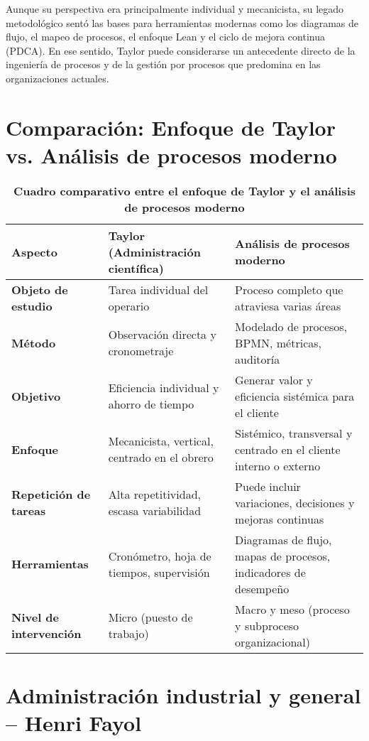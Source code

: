 \documentclass[a4paper,12pt]{article}
\begin{document}
	Aunque su perspectiva era principalmente individual y mecanicista, su legado metodológico sentó las bases para herramientas modernas como los diagramas de flujo, el mapeo de procesos, el enfoque Lean y el ciclo de mejora continua (PDCA). En ese sentido, Taylor puede considerarse un antecedente directo de la ingeniería de procesos y de la gestión por procesos que predomina en las organizaciones actuales.
	
	
	\section*{Comparación: Enfoque de Taylor vs. Análisis de procesos moderno}
	
	\begin{table}[h!]
		\centering
		\caption*{\textbf{Cuadro comparativo entre el enfoque de Taylor y el análisis de procesos moderno}}
		\begin{tabularx}{\textwidth}{>{\bfseries}l X X}
			\toprule
			\textbf{Aspecto} & \textbf{Taylor (Administración científica)} & \textbf{Análisis de procesos moderno} \\
			\midrule
			Objeto de estudio & Tarea individual del operario & Proceso completo que atraviesa varias áreas \\
			\addlinespace
			Método & Observación directa y cronometraje & Modelado de procesos, BPMN, métricas, auditoría \\
			\addlinespace
			Objetivo & Eficiencia individual y ahorro de tiempo & Generar valor y eficiencia sistémica para el cliente \\
			\addlinespace
			Enfoque & Mecanicista, vertical, centrado en el obrero & Sistémico, transversal y centrado en el cliente interno o externo \\
			\addlinespace
			Repetición de tareas & Alta repetitividad, escasa variabilidad & Puede incluir variaciones, decisiones y mejoras continuas \\
			\addlinespace
			Herramientas & Cronómetro, hoja de tiempos, supervisión & Diagramas de flujo, mapas de procesos, indicadores de desempeño \\
			\addlinespace
			Nivel de intervención & Micro (puesto de trabajo) & Macro y meso (proceso y subproceso organizacional) \\
			\bottomrule
		\end{tabularx}
	\end{table}
	
	\section{Administración industrial y general – Henri Fayol}
	
\end{document}
